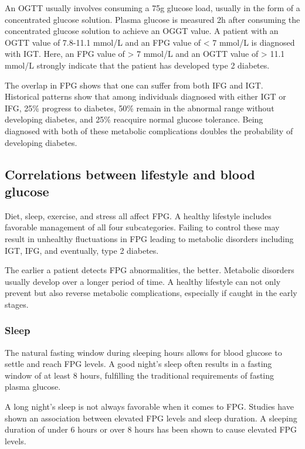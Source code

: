 \documentclass[english, 12pt, a4paper, elec, utf8, a-1b, online]{aaltothesis}
\begin{document}
An OGTT usually involves consuming a 75g glucose load, usually in the form of a concentrated 
glucose solution. Plasma glucose is measured 2h after consuming the concentrated glucose solution to achieve an OGGT value. 
A patient with an OGTT value of 7.8-11.1 mmol/L and an FPG value of < 7 mmol/L is diagnosed with IGT\cite{nathan_impaired_2007}. 
Here, an FPG value of > 7 mmol/L and an OGTT value of > 11.1 mmol/L strongly indicate that the patient has developed type 2 
diabetes\cite{walker_diet_2010}\cite{diabetes_tests}.

The overlap in FPG shows that one can suffer from both IFG and IGT. Historical patterns show that among individuals 
diagnosed with either IGT or IFG, 25\% progress to diabetes, 50\% remain in the abnormal range 
without developing diabetes, and 25\% reacquire normal glucose tolerance. 
Being diagnosed with both of these metabolic complications doubles the probability of developing diabetes\cite{nathan_impaired_2007}.


\subsection{Correlations between lifestyle and blood glucose}
Diet, sleep, exercise, and stress all affect FPG. A healthy lifestyle 
includes favorable management of all four subcategories. Failing to control these may result in 
unhealthy fluctuations in FPG leading to metabolic disorders including IGT, IFG, and eventually, type 2 diabetes\cite{yamaoka_effects_2012}.

The earlier a patient detects FPG abnormalities, the better. 
Metabolic disorders usually develop over a longer period of time. A healthy lifestyle can not only prevent but also 
reverse metabolic complications, especially if caught in the early stages\cite{taylor_type_2013}. 

\subsubsection{Sleep}
The natural fasting window during sleeping hours allows for blood glucose to settle and reach FPG levels. A good night's sleep often results in a 
fasting window of at least 8 hours, fulfilling the traditional requirements of fasting plasma glucose.

A long night's sleep is not always favorable when it comes to FPG. Studies 
have shown an association between elevated FPG levels and sleep duration. A sleeping duration of under 6 hours or over 8 hours
has been shown to cause elevated FPG levels\cite{nakajima_association_2008}. 
\end{document}
